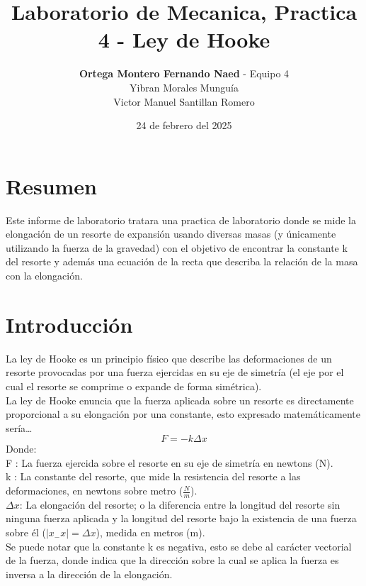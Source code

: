 \documentclass[12pt,a4paper]{article}
\begin{document}
\title{Laboratorio de Mecanica, Practica 4 - Ley de Hooke}
\date{24 de febrero del 2025}
\author{\textbf{Ortega Montero Fernando Naed} - Equipo 4\\
Yibran Morales Munguía\\
Victor Manuel Santillan Romero}
\maketitle
\section{Resumen} 

Este informe de laboratorio tratara una practica de laboratorio donde se mide la elongación de un resorte de expansión usando diversas masas (y únicamente utilizando la fuerza de la gravedad) con el objetivo de encontrar la constante k del resorte y además una ecuación de la recta que describa la relación de la masa con la elongación. 

\section{Introducción}

La ley de Hooke es un principio físico que describe las deformaciones de un resorte provocadas por una fuerza ejercidas en su eje de simetría (el eje por el cual el resorte se comprime o expande de forma simétrica).  \\
La ley de Hooke enuncia que la fuerza aplicada sobre un resorte es directamente proporcional a su elongación por una constante, esto expresado matemáticamente sería…
\[F = -k \Delta x\]
Donde:\\

F : La fuerza ejercida sobre el resorte en su eje de simetría en newtons (N).\\

k : La constante del resorte, que mide la resistencia del resorte a las deformaciones, en newtons sobre metro ($\frac{N}{m}$).\\

$\Delta x$: La elongación del resorte; o la diferencia entre la longitud del resorte sin ninguna fuerza aplicada y la longitud del resorte bajo la existencia de una fuerza sobre él ($|x_ - x|  = \Delta x$), medida en metros (m).\\

Se puede notar que la constante k es negativa, esto se debe al carácter vectorial de la fuerza, donde indica que la dirección sobre la cual se aplica la fuerza es inversa a la dirección de la elongación. \\
\end{document}
